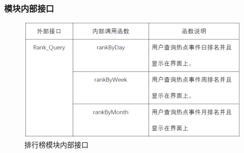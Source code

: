 \subsubsection{模块内部接口}
\begin{figure}[!htbp]
	\centering
	\includegraphics[scale=0.7]{image/b17.png} %
	\caption{排行榜模块内部接口} %
\end{figure}
